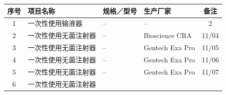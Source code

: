 \documentclass[UTF8,10pt,a4paper,fontset=fandol]{ctexart}
\newcommand{\fieldvalue}[1]{#1}
\newcommand{\handwritten}[1]{#1}
\begin{document}
\begin{tabularx}{\textwidth}{|c|X|X|X|c|}
\hline
序号 & 项目名称 & 规格／型号 & 生产厂家 & 备注 \\
\hline
1 &
\fieldvalue{一次性使用输液器} &
\fieldvalue{--} &
\fieldvalue{--} &
\fieldvalue{\handwritten{2}} \\
\hline
2 &
\fieldvalue{一次性使用无菌注射器} &
\fieldvalue{--} &
\fieldvalue{Bioscience CRA} &
\fieldvalue{\handwritten{11/04}} \\
\hline
3 &
\fieldvalue{一次性使用无菌注射器} &
\fieldvalue{--} &
\fieldvalue{Gentech Exa Pro} &
\fieldvalue{\handwritten{11/05}} \\
\hline
4 &
\fieldvalue{一次性使用无菌注射器} &
\fieldvalue{--} &
\fieldvalue{Gentech Exa Pro} &
\fieldvalue{\handwritten{11/06}} \\
\hline
5 &
\fieldvalue{一次性使用无菌注射器} &
\fieldvalue{--} &
\fieldvalue{Gentech Exa Pro} &
\fieldvalue{\handwritten{11/07}} \\
\hline
6 &
\fieldvalue{一次性使用无菌注射器} &

\end{tabularx}
\end{document}
